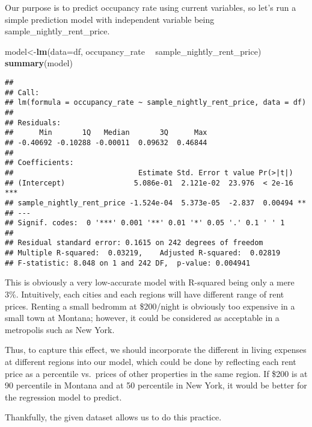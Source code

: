 \documentclass[]{article}
\newenvironment{Shaded}{\begin{snugshade}}{\end{snugshade}}
\newcommand{\DataTypeTok}[1]{\textcolor[rgb]{0.13,0.29,0.53}{#1}}
\newcommand{\KeywordTok}[1]{\textcolor[rgb]{0.13,0.29,0.53}{\textbf{#1}}}
\newcommand{\NormalTok}[1]{#1}
\newcommand{\OperatorTok}[1]{\textcolor[rgb]{0.81,0.36,0.00}{\textbf{#1}}}
\newcommand{\StringTok}[1]{\textcolor[rgb]{0.31,0.60,0.02}{#1}}
\begin{document}
Our purpose is to predict occupancy rate using current variables, so
let's run a simple prediction model with independent variable being
sample\_nightly\_rent\_price.

\begin{Shaded}
\begin{Highlighting}[]
\NormalTok{model<-}\KeywordTok{lm}\NormalTok{(}\DataTypeTok{data=}\NormalTok{df, occupancy_rate }\OperatorTok{~}\StringTok{ }\NormalTok{sample_nightly_rent_price)}
\KeywordTok{summary}\NormalTok{(model)}
\end{Highlighting}
\end{Shaded}

\begin{verbatim}
## 
## Call:
## lm(formula = occupancy_rate ~ sample_nightly_rent_price, data = df)
## 
## Residuals:
##      Min       1Q   Median       3Q      Max 
## -0.40692 -0.10288 -0.00011  0.09632  0.46844 
## 
## Coefficients:
##                             Estimate Std. Error t value Pr(>|t|)    
## (Intercept)                5.086e-01  2.121e-02  23.976  < 2e-16 ***
## sample_nightly_rent_price -1.524e-04  5.373e-05  -2.837  0.00494 ** 
## ---
## Signif. codes:  0 '***' 0.001 '**' 0.01 '*' 0.05 '.' 0.1 ' ' 1
## 
## Residual standard error: 0.1615 on 242 degrees of freedom
## Multiple R-squared:  0.03219,    Adjusted R-squared:  0.02819 
## F-statistic: 8.048 on 1 and 242 DF,  p-value: 0.004941
\end{verbatim}

This is obviously a very low-accurate model with R-squared being only a
mere 3\%. Intuitively, each cities and each regions will have different
range of rent prices. Renting a small bedromm at \$200/night is
obviously too expensive in a small town at Montana; however, it could be
considered as acceptable in a metropolis such as New York.

Thus, to capture this effect, we should incorporate the different in
living expenses at different regions into our model, which could be done
by reflecting each rent price as a percentile vs.~prices of other
properties in the same region. If \$200 is at 90 percentile in Montana
and at 50 percentile in New York, it would be better for the regression
model to predict.

Thankfully, the given dataset allows us to do this practice.
\end{document}
